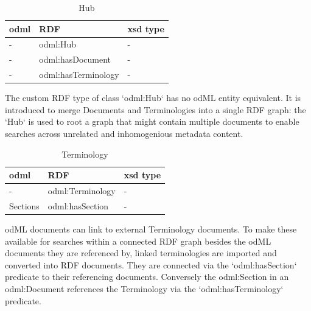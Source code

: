 \documentclass{article}
\begin{document}
\begin{table}
\begin{threeparttable}
\caption{Hub}
\begin{tabular}{l|l|l}
    odml            & RDF                           & xsd type \\
\hline
    -               & odml:Hub                      & - \\
    -               & odml:hasDocument              & - \\
    -               & odml:hasTerminology           & - \\
\end{tabular}
\begin{tablenotes}
\item The custom RDF type of class `odml:Hub` has no odML entity equivalent. It is introduced to merge Documents and Terminologies into a single RDF graph: the `Hub` is used to root a graph that might contain multiple documents to enable searches across unrelated and inhomogenious metadata content.
\end{tablenotes}
\end{threeparttable}
\end{table}

\begin{table}
\begin{threeparttable}
\caption{Terminology}
\begin{tabular}{l|l|l}
    odml            & RDF                               & xsd type \\
\hline
    -               & odml:Terminology                  & - \\
    Sections        & odml:hasSection                   & - \\

\end{tabular}
\begin{tablenotes}
\item odML documents can link to external Terminology documents. To make these available for searches within a connected RDF graph besides the odML documents they are referenced by, linked terminologies are imported and converted into RDF documents. They are connected via the `odml:hasSection` predicate to their referencing documents. Conversely the odml:Section in an odml:Document references the Terminology via the `odml:hasTerminology` predicate.
\end{tablenotes}
\end{threeparttable}
\end{table}
\end{document}
